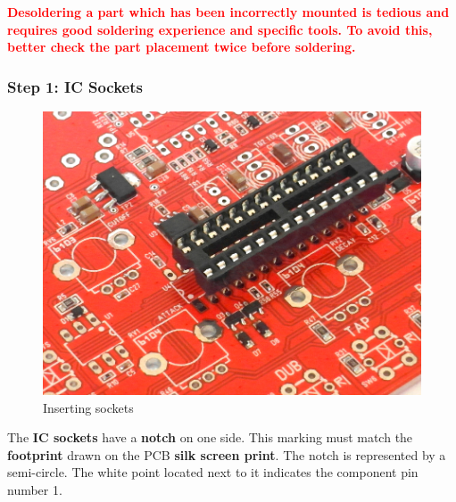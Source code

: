\documentclass{scrartcl}
\begin{document}
\vspace{0.5cm}
\begin{tcolorbox}
    \textcolor{red}{
        \textbf{Desoldering a part which has been incorrectly mounted is tedious and requires good soldering experience and specific tools. To avoid this, better check the part placement twice before soldering.}
    }
\end{tcolorbox}

\pagebreak
\subsubsection{Step 1: IC Sockets}

\begin{figure}[!ht]
    \begin{center}
        \includegraphics[scale=0.30]{assets/ic-socket.jpg}
        \caption{Inserting sockets}
    \end{center}
\end{figure}

The \textbf{IC sockets} have a \textbf{notch} on one side.
This marking must match the \textbf{footprint} drawn on the PCB \textbf{silk screen print}. The notch is represented by a semi-circle. The white point located next to it indicates the component pin number 1.
\end{document}

